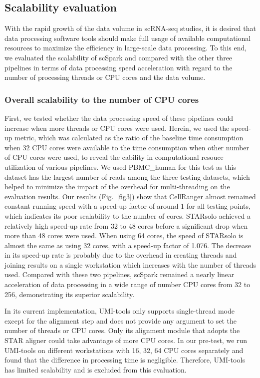 \documentclass[conference]{IEEEtran}
\begin{document}
\subsection{Scalability evaluation}
With the rapid growth of the data volume in scRNA-seq studies, it is desired that data processing software tools should make full usage of available computational resources to maximize the efficiency in large-scale data processing. To this end, we evaluated the scalability of scSpark and compared with the other three pipelines in terms of data processing speed acceleration with regard to the number of processing threads or CPU cores and the data volume.

\subsubsection{Overall scalability to the number of CPU cores}
First, we tested whether the data processing speed of these pipelines could increase when more threads or CPU cores were used. Herein, we used the speed-up metric, which was calculated as the ratio of the baseline time consumption when 32 CPU cores were available to the time consumption when other number of CPU cores were used, to reveal the cability in computational resouce utilization of various pipelines. 
We used PBMC\_human for this test as this dataset has the largest number of reads among the three testing datasets, which helped to minimize the impact of the overhead for multi-threading on the evaluation results. 
Our results (Fig.~\ref{fig3}) show that CellRanger almost remained constant running speed with a speed-up factor of around 1 for all testing points, which indicates its poor scalability to the number of cores. 
STARsolo achieved a relatively high speed-up rate from 32 to 48 cores before a significant drop when more than 48 cores were used. When using 64 cores, the speed of STARsolo is almost the same as using 32 cores, with a speed-up factor of 1.076. 
The decrease in its speed-up rate is probably due to the overhead in creating threads and joining results on a single workstation which increases with the number of threads used. 
Compared with these two pipelines, scSpark remained a nearly linear acceleration of data processing in a wide range of number CPU cores from 32 to 256, demonstrating its superior scalability. 

In its current implementation, UMI-tools only supports single-thread mode except for the alignment step and does not provide any argument to set the number of threads or CPU cores. Only its alignment module that adopts the STAR aligner could take advantage of more CPU cores. 
In our pre-test, we run UMI-tools on different workstations with 16, 32, 64 CPU cores separately and found that the difference in processing time is negligible. 
Therefore, UMI-tools has limited scalability and is excluded from this evaluation. 
\end{document}
